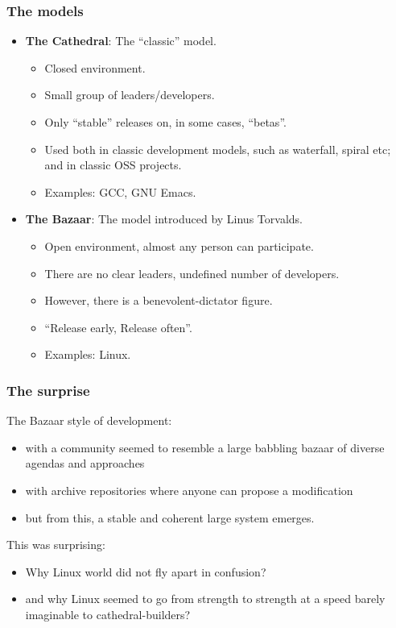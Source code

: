 \documentclass{beamer}
\begin{document}
\begin{frame}
\frametitle{The models}

\begin{itemize}
\item {\bf The Cathedral}: The ``classic'' model.
\begin{itemize}
\item Closed environment.
\item Small group of leaders/developers.
\item Only ``stable'' releases on, in some cases, ``betas''.
\item Used both in classic development models, such as waterfall, spiral etc;
  and in classic OSS projects.
\item Examples: GCC, GNU Emacs.
\end{itemize}

\item {\bf The Bazaar}: The model introduced by Linus Torvalds.
\begin{itemize}
\item Open environment, almost any person can participate.
\item There are no clear leaders, undefined number of developers.
\item However, there is a benevolent-dictator figure.
\item ``Release early, Release often''.
\item Examples: Linux.
\end{itemize}
\end{itemize}

\end{frame}

\begin{frame}
\frametitle{The surprise}

The Bazaar style of development:
\begin{itemize}
\item with a community seemed to resemble a large babbling bazaar of
  diverse agendas and approaches
\item with archive repositories where anyone can propose a
  modification
\item but from this, a stable and coherent large system emerges.
\end{itemize}

This was surprising:
\begin{itemize}
\item Why Linux world did not fly apart in confusion?
\item and why Linux seemed to go from strength to strength at a speed
  barely imaginable to cathedral-builders?
\end{itemize}

\end{frame}
\end{document}
